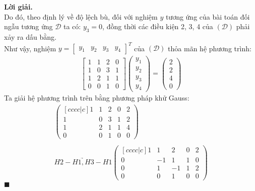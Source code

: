 \documentclass[12pt]{article}
\newenvironment{solution}{%
     \setlength\parindent{0pt}\par\medskip\textbf{Lời giải.}\quad}{%
     \hfill\tiny$\blacksquare$\par\medskip}
\begin{document}
\begin{solution}
        \\
        Do đó, theo định lý về độ lệch bù, đối với nghiệm $y$ tương ứng của bài toán đối ngẫu tương ứng $\mathcal{D}$ ta có: $y_3 = 0$, đồng thời các điều kiện 2, 3, 4 của $(\mathcal{D})$ phải xảy ra dấu bằng.
        \\
        Như vậy, nghiệm $y = \begin{bmatrix} y_1 & y_2 & y_3 & y_4 \end{bmatrix}^T$ của $(\mathcal{D})$ thỏa mãn hệ phương trình:
        \begin{align*}
            \begin{bmatrix}
                1 & 1 & 2 & 0 \\
                1 & 0 & 3 & 1 \\
                1 & 2 & 1 & 1 \\
                0 & 0 & 1 & 0
            \end{bmatrix} \begin{pmatrix} y_1 \\ y_2 \\ y_3 \\ y_4 \end{pmatrix} = \begin{pmatrix} 2 \\ 2 \\ 4 \\ 0 \end{pmatrix}
        \end{align*}
        Ta giải hệ phương trình trên bằng phương pháp khử Gauss:
        \begin{align*}
            \begin{pmatrix}[cccc|c]
                1 & 1 & 2 & 0 & 2 \\
                1 & 0 & 3 & 1 & 2 \\
                1 & 2 & 1 & 1 & 4 \\
                0 & 0 & 1 & 0 & 0
            \end{pmatrix}
            \\
            \\
            \underrightarrow{H2 - H1, H3 - H1} \begin{pmatrix}[cccc|c]
                1 & 1 & 2 & 0 & 2 \\
                0 & -1 & 1 & 1 & 0 \\
                0 & 1 & -1 & 1 & 2 \\
                0 & 0 & 1 & 0 & 0
            \end{pmatrix}

\end{align*}
\end{solution}
\end{document}
